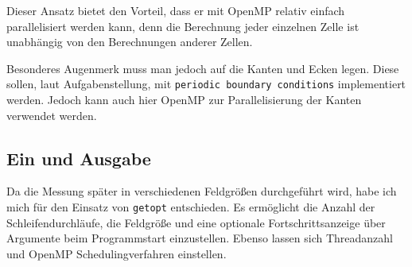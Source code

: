 \documentclass[german,plainarticle,hyperref,utf8]{zihpub}
\begin{document}
	Dieser Ansatz bietet den Vorteil, dass er mit OpenMP relativ einfach parallelisiert werden kann, denn die Berechnung jeder einzelnen Zelle ist unabhängig von den Berechnungen anderer Zellen.
	
	Besonderes Augenmerk muss man jedoch auf die Kanten und Ecken legen. Diese sollen, laut Aufgabenstellung, mit \verb|periodic boundary conditions| implementiert werden. Jedoch kann auch hier OpenMP zur Parallelisierung der Kanten verwendet werden.

	\subsection{Ein und Ausgabe}
	Da die Messung später in verschiedenen Feldgrößen durchgeführt wird, habe ich mich für den Einsatz von \verb|getopt| entschieden. Es ermöglicht die Anzahl der Schleifendurchläufe, die Feldgröße und eine optionale Fortschrittsanzeige über Argumente beim Programmstart einzustellen.
	Ebenso lassen sich Threadanzahl und OpenMP Schedulingverfahren einstellen.
	
	

\end{document}
